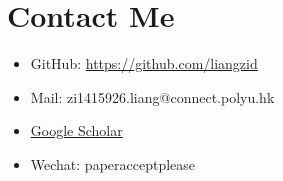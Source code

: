\documentclass[11pt]{article}
\begin{document}
\section{Contact Me}
\label{sec:orge2c56c6}
\begin{itemize}
\item GitHub: \url{https://github.com/liangzid}
\item Mail: zi1415926.liang@connect.polyu.hk
\item \href{https://scholar.google.com/citations?user=pzrGwvMAAAAJ\&hl=zh-CN}{Google Scholar}
\item Wechat: paperacceptplease
\end{itemize}
\end{document}
